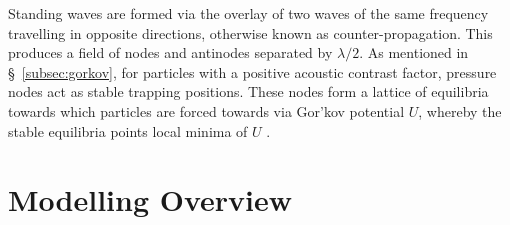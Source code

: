 \documentclass[11pt,a4paper]{article}
\begin{document}
Standing waves are formed via the overlay of two waves of the same frequency travelling in opposite directions, otherwise known as counter-propagation. This produces a field of nodes and antinodes separated by $\lambda/2$. As mentioned in \S~\ref{subsec:gorkov}, for particles with a positive acoustic contrast factor, pressure nodes act as stable trapping positions. These nodes form a lattice of equilibria towards which particles are forced towards via Gor'kov potential $U$, whereby the stable equilibria points local minima of $U$ \cite{marzo2019holographic, settnes2012forces, gorkov1962}.

\section{Modelling Overview}
\label{sec:model-overview}
\end{document}
